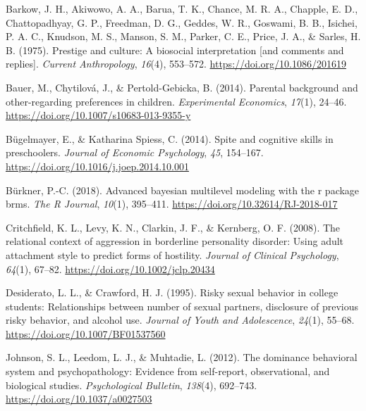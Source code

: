 \documentclass[
  english,
  a4paper,floatsintext]{apa7}
\newlength{\cslhangindent}
\newlength{\cslentryspacingunit} %
\newenvironment{CSLReferences}[2] %
 {%
  \setlength{\parindent}{0pt}
  \ifodd #1
  \let\oldpar\par
  \def\par{\hangindent=\cslhangindent\oldpar}
  \fi
  \setlength{\parskip}{#2\cslentryspacingunit}
 }%
 {}
\begin{document}
\hypertarget{refs}{}
\begin{CSLReferences}{1}{0}
\leavevmode{}%
Barkow, J. H., Akiwowo, A. A., Barua, T. K., Chance, M. R. A., Chapple, E. D., Chattopadhyay, G. P., Freedman, D. G., Geddes, W. R., Goswami, B. B., Isichei, P. A. C., Knudson, M. S., Manson, S. M., Parker, C. E., Price, J. A., \& Sarles, H. B. (1975). Prestige and culture: A biosocial interpretation {[}and comments and replies{]}. \emph{Current Anthropology}, \emph{16}(4), 553--572. \url{https://doi.org/10.1086/201619}

\leavevmode{}%
Bauer, M., Chytilová, J., \& Pertold-Gebicka, B. (2014). Parental background and other-regarding preferences in children. \emph{Experimental Economics}, \emph{17}(1), 24--46. \url{https://doi.org/10.1007/s10683-013-9355-y}

\leavevmode{}%
Bügelmayer, E., \& Katharina Spiess, C. (2014). Spite and cognitive skills in preschoolers. \emph{Journal of Economic Psychology}, \emph{45}, 154--167. \url{https://doi.org/10.1016/j.joep.2014.10.001}

\leavevmode{}%
Bürkner, P.-C. (2018). Advanced bayesian multilevel modeling with the r package brms. \emph{The R Journal}, \emph{10}(1), 395--411. \url{https://doi.org/10.32614/RJ-2018-017}

\leavevmode{}%
Critchfield, K. L., Levy, K. N., Clarkin, J. F., \& Kernberg, O. F. (2008). The relational context of aggression in borderline personality disorder: Using adult attachment style to predict forms of hostility. \emph{Journal of Clinical Psychology}, \emph{64}(1), 67--82. \url{https://doi.org/10.1002/jclp.20434}

\leavevmode{}%
Desiderato, L. L., \& Crawford, H. J. (1995). Risky sexual behavior in college students: Relationships between number of sexual partners, disclosure of previous risky behavior, and alcohol use. \emph{Journal of Youth and Adolescence}, \emph{24}(1), 55--68. \url{https://doi.org/10.1007/BF01537560}

\leavevmode{}%
Johnson, S. L., Leedom, L. J., \& Muhtadie, L. (2012). The dominance behavioral system and psychopathology: Evidence from self-report, observational, and biological studies. \emph{Psychological Bulletin}, \emph{138}(4), 692--743. \url{https://doi.org/10.1037/a0027503}


\end{CSLReferences}
\end{document}
